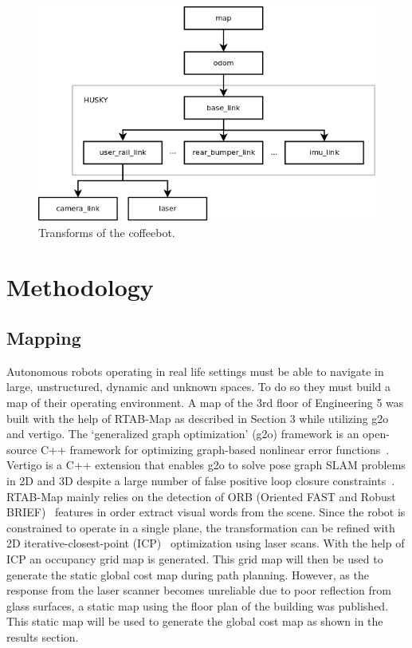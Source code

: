 \documentclass[letterpaper, 10 pt, conference]{ieeeconf}  %
\begin{document}
	\begin{figure}[!ht]
		\centering
		\includegraphics[width=1.0\columnwidth]{Figures/ROS_TF_diagram}
		\caption{Transforms of the coffeebot.}
		\label{transform_tree}
	\end{figure}

\section{Methodology}

\subsection{Mapping}

Autonomous robots operating in real life settings must be able to navigate in large, unstructured, dynamic and unknown spaces. To do so they must build a map of their operating environment. A map of the 3rd floor of Engineering 5 was built with the help of RTAB-Map as described in Section 3 while utilizing g2o and vertigo. The \enquote*{generalized graph optimization} (g2o) framework is an open-source C++ framework for optimizing graph-based nonlinear error functions~\cite{G2O}. Vertigo is a C++ extension that enables g2o to solve pose graph SLAM problems in 2D and 3D despite a large number of false positive loop closure constraints~\cite{vertigo}. RTAB-Map mainly relies on the detection of ORB (Oriented FAST and Robust BRIEF)~\cite{ORB} features in order extract visual words from the scene. Since the robot is constrained to operate in a single plane, the transformation can be refined with 2D iterative-closest-point (ICP)~\cite{3Dshape} optimization using laser scans. With the help of ICP an occupancy grid map is generated. This grid map will then be used to generate the static global cost map during path planning. However, as the response from the laser scanner becomes unreliable due to poor reflection from glass surfaces, a static map using the floor plan of the building was published. This static map will be used to generate the global cost map as shown in the results section.
\end{document}
